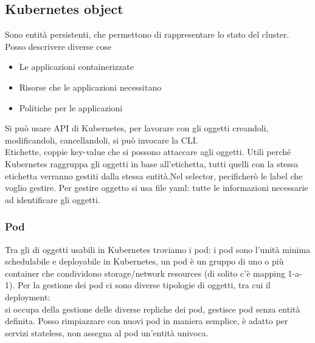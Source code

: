 \documentclass[16px]{article}
\begin{document}
\subsection{Kubernetes object}
Sono entità persistenti, che permettono di rappresentare lo stato del cluster. Posso descrivere diverse cose
\begin{itemize}
\item Le applicazioni containerizzate
\item Risorse che le applicazioni necessitano
\item Politiche per le applicazioni
\end{itemize}
Si può usare API di Kubernetes, per lavorare con gli oggetti creandoli, modificandoli, cancellandoli, si può invocare la CLI.\\
Etichette, coppie key-value che si possono attaccare agli oggetti. Utili perché Kubernetes raggruppa gli oggetti in base all'etichetta, tutti quelli con la stessa etichetta verranno gestiti dalla stessa entità.Nel selector, pecificherò le label che voglio gestire. Per gestire oggetto si usa file yaml: tutte le informazioni necessarie ad identificare gli oggetti.
\subsubsection{Pod} 
Tra gli di oggetti usabili in Kubernetes troviamo i pod: i pod sono l'unità minima schedulabile e deployabile in Kubernetes, un pod è un gruppo di uno o più container che condividono storage/network resources (di solito c'è mapping 1-a-1). Per la gestione dei pod ci sono diverse tipologie di oggetti, tra cui il deployment:\\
si occupa della gestione delle diverse repliche dei pod, gestisce pod senza entità definita. Posso rimpiazzare con nuovi pod in maniera semplice, è adatto per servizi stateless, non assegna al pod un'entità univoca.
\end{document}
